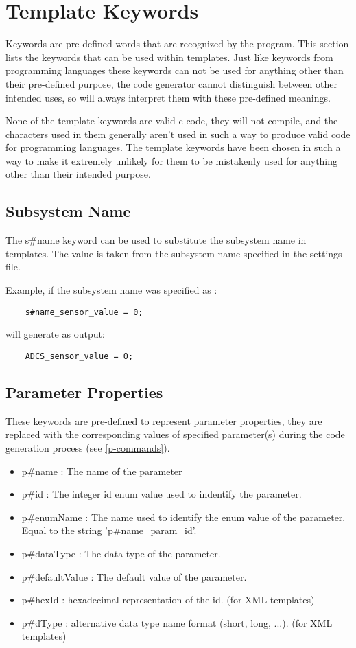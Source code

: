 \documentclass{settings/TU_Delft_Report}
\begin{document}
\section{Template Keywords}
Keywords are pre-defined words that are recognized by the program. This section lists the keywords that can be used within templates. Just like keywords from programming languages these keywords can not be used for anything other than their pre-defined purpose, the code generator cannot distinguish between other intended uses, so will always interpret them with these pre-defined meanings.

None of the template keywords are valid c-code, they will not compile, and the characters used in them generally aren't used in such a way to produce valid code for programming languages. The template keywords have been chosen in such a way to make it extremely unlikely for them to be mistakenly used for anything other than their intended purpose.

\subsection{Subsystem Name} \label{s:sname}
The s\#name keyword can be used to substitute the subsystem name in templates. The value is taken from the subsystem name specified in the settings file.

\vsp Example, if the subsystem name was specified as : 
\begin{lstlisting}
    s#name_sensor_value = 0;
\end{lstlisting}
will generate as output:
\begin{lstlisting}
    ADCS_sensor_value = 0;
\end{lstlisting}

\subsection{Parameter Properties} \label{par-keywords}
These keywords are pre-defined to represent parameter properties, they are replaced with the corresponding values of specified parameter(s) during the code generation process (see \ref{p-commands}).
\begin{itemize}
    \item p\#name : The name of the parameter
    \item p\#id : The integer id enum value used to indentify the parameter.
    \item p\#enumName : The name used to identify the enum value of the parameter. Equal to the string 'p\#name\_param\_id'. 
    \item p\#dataType : The data type of the parameter.
    \item p\#defaultValue : The default value of the parameter.
    \item p\#hexId : hexadecimal representation of the id. (for XML templates)
    \item p\#dType : alternative data type name format (short, long, ...). (for XML templates)
\end{itemize}
\end{document}
